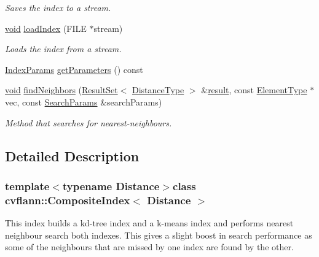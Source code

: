\begin{DoxyCompactItemize}
\begin{DoxyCompactList}\small\item\em Saves the index to a stream. \end{DoxyCompactList}\item 
\hyperlink{legacy_8hpp_a8bb47f092d473522721002c86c13b94e}{void} \hyperlink{classcvflann_1_1CompositeIndex_a0f990c13fb33079649b57ab670a99ab9}{load\-Index} (F\-I\-L\-E $\ast$stream)
\begin{DoxyCompactList}\small\item\em Loads the index from a stream. \end{DoxyCompactList}\item 
\hyperlink{namespacecvflann_a742b4c7076c21012054af74a9ee48289}{Index\-Params} \hyperlink{classcvflann_1_1CompositeIndex_ab1b2a4a7a9da54d63115eb5c4451555a}{get\-Parameters} () const 
\item 
\hyperlink{legacy_8hpp_a8bb47f092d473522721002c86c13b94e}{void} \hyperlink{classcvflann_1_1CompositeIndex_a415d0daafd176f0f3a794281d3483c50}{find\-Neighbors} (\hyperlink{classcvflann_1_1ResultSet}{Result\-Set}$<$ \hyperlink{classcvflann_1_1CompositeIndex_a9970db892c04fb4dcb0b8a1c2e80a165}{Distance\-Type} $>$ \&\hyperlink{legacy_8hpp_a0bb77d54f6769867cfdf389897bd8e43}{result}, const \hyperlink{classcvflann_1_1CompositeIndex_a3953e495ac70dfec4d1165a8f95b5fad}{Element\-Type} $\ast$vec, const \hyperlink{structcvflann_1_1SearchParams}{Search\-Params} \&search\-Params)
\begin{DoxyCompactList}\small\item\em Method that searches for nearest-\/neighbours. \end{DoxyCompactList}\end{DoxyCompactItemize}


\subsection{Detailed Description}
\subsubsection*{template$<$typename Distance$>$class cvflann\-::\-Composite\-Index$<$ Distance $>$}

This index builds a kd-\/tree index and a k-\/means index and performs nearest neighbour search both indexes. This gives a slight boost in search performance as some of the neighbours that are missed by one index are found by the other. 

